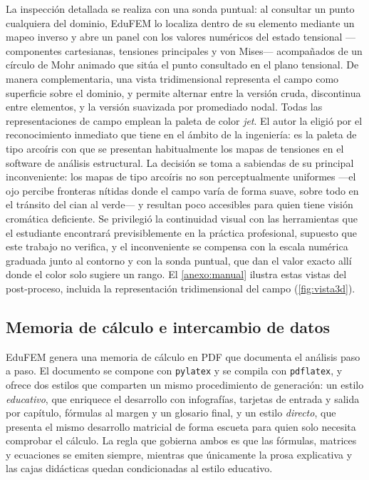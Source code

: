 La inspección detallada se realiza con una sonda puntual: al consultar un punto cualquiera del dominio, EduFEM lo localiza dentro de su elemento mediante un mapeo inverso y abre un panel con los valores numéricos del estado tensional —componentes cartesianas, tensiones principales y von Mises— acompañados de un círculo de Mohr animado que sitúa el punto consultado en el plano tensional. De manera complementaria, una vista tridimensional representa el campo como superficie sobre el dominio, y permite alternar entre la versión cruda, discontinua entre elementos, y la versión suavizada por promediado nodal. Todas las representaciones de campo emplean la paleta de color \emph{jet}. El autor la eligió por el reconocimiento inmediato que tiene en el ámbito de la ingeniería: es la paleta de tipo arcoíris con que se presentan habitualmente los mapas de tensiones en el software de análisis estructural. La decisión se toma a sabiendas de su principal inconveniente: los mapas de tipo arcoíris no son perceptualmente uniformes —el ojo percibe fronteras nítidas donde el campo varía de forma suave, sobre todo en el tránsito del cian al verde— y resultan poco accesibles para quien tiene visión cromática deficiente. Se privilegió la continuidad visual con las herramientas que el estudiante encontrará previsiblemente en la práctica profesional, supuesto que este trabajo no verifica, y el inconveniente se compensa con la escala numérica graduada junto al contorno y con la sonda puntual, que dan el valor exacto allí donde el color solo sugiere un rango. El \autoref{anexo:manual} ilustra estas vistas del post-proceso, incluida la representación tridimensional del campo (\autoref{fig:vista3d}).

\subsection{Memoria de cálculo e intercambio de datos}
\label{sec:memoria-io}

EduFEM genera una memoria de cálculo en PDF que documenta el análisis paso a paso. El documento se compone con \texttt{pylatex} y se compila con \texttt{pdflatex}, y ofrece dos estilos que comparten un mismo procedimiento de generación: un estilo \emph{educativo}, que enriquece el desarrollo con infografías, tarjetas de entrada y salida por capítulo, fórmulas al margen y un glosario final, y un estilo \emph{directo}, que presenta el mismo desarrollo matricial de forma escueta para quien solo necesita comprobar el cálculo. La regla que gobierna ambos es que las fórmulas, matrices y ecuaciones se emiten siempre, mientras que únicamente la prosa explicativa y las cajas didácticas quedan condicionadas al estilo educativo.

